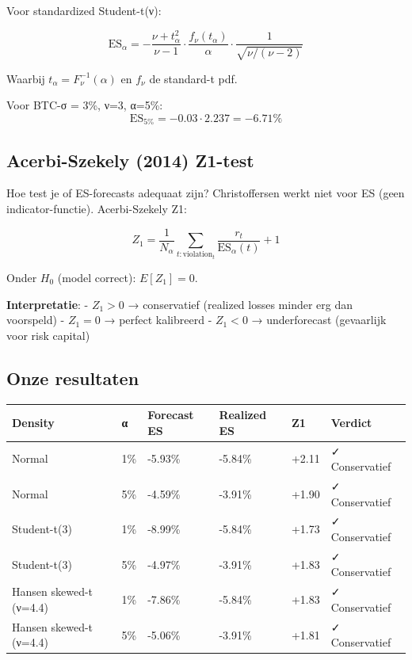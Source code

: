 Voor standardized Student-t(ν):

\[\text{ES}_\alpha = -\frac{\nu + t_\alpha^2}{\nu - 1} \cdot \frac{f_\nu(t_\alpha)}{\alpha} \cdot \frac{1}{\sqrt{\nu/(\nu-2)}}\]

Waarbij \(t_\alpha = F^{-1}_\nu(\alpha)\) en \(f_\nu\) de standard-t pdf.

Voor BTC-σ = 3\%, ν=3, α=5\%:
\[\text{ES}_{5\%} = -0.03 \cdot 2.237 = -6.71\%\]

\hypertarget{acerbi-szekely-2014-z1-test}{%
\subsection{Acerbi-Szekely (2014) Z1-test}\label{acerbi-szekely-2014-z1-test}}

Hoe test je of ES-forecasts adequaat zijn? Christoffersen werkt niet voor ES (geen indicator-functie). Acerbi-Szekely Z1:

\[Z_1 = \frac{1}{N_\alpha} \sum_{t: \text{violation}_t} \frac{r_t}{\text{ES}_\alpha(t)} + 1\]

Onder \(H_0\) (model correct): \(E[Z_1] = 0\).

\textbf{Interpretatie}:
- \(Z_1 > 0\) → conservatief (realized losses minder erg dan voorspeld)
- \(Z_1 = 0\) → perfect kalibreerd
- \(Z_1 < 0\) → underforecast (gevaarlijk voor risk capital)

\hypertarget{onze-resultaten-1}{%
\subsection{Onze resultaten}\label{onze-resultaten-1}}

\begin{longtable}[]{@{}llllll@{}}
\toprule
Density & α & Forecast ES & Realized ES & Z1 & Verdict \\
\midrule
\endhead
Normal & 1\% & -5.93\% & -5.84\% & +2.11 & ✓ Conservatief \\
Normal & 5\% & -4.59\% & -3.91\% & +1.90 & ✓ Conservatief \\
Student-t(3) & 1\% & -8.99\% & -5.84\% & +1.73 & ✓ Conservatief \\
Student-t(3) & 5\% & -4.97\% & -3.91\% & +1.83 & ✓ Conservatief \\
Hansen skewed-t (ν=4.4) & 1\% & -7.86\% & -5.84\% & +1.83 & ✓ Conservatief \\
Hansen skewed-t (ν=4.4) & 5\% & -5.06\% & -3.91\% & +1.81 & ✓ Conservatief \\
\bottomrule
\end{longtable}

